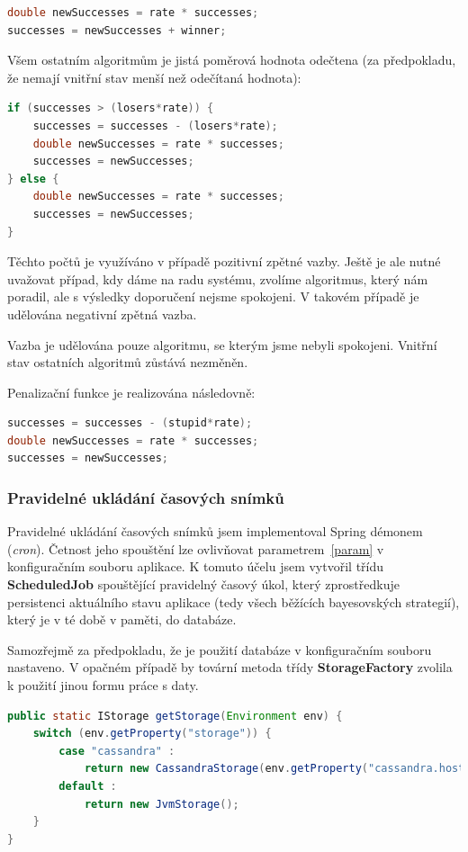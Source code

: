 \documentclass[thesis=M,czech]{FITthesis}[2014/05/07]
\begin{document}
\begin{lstlisting}[language=java]
double newSuccesses = rate * successes;
successes = newSuccesses + winner;
\end{lstlisting}	

Všem ostatním algoritmům je jistá poměrová hodnota odečtena (za předpokladu, že nemají vnitřní stav menší než odečítaná hodnota):

\begin{lstlisting}[language=java]
if (successes > (losers*rate)) {
    successes = successes - (losers*rate);
    double newSuccesses = rate * successes;
    successes = newSuccesses;
} else {
    double newSuccesses = rate * successes;
    successes = newSuccesses;            
}
\end{lstlisting}	

Těchto počtů je využíváno v případě pozitivní zpětné vazby. Ještě je ale nutné uvažovat případ, kdy dáme na radu systému, zvolíme algoritmus, který nám poradil, ale s výsledky doporučení nejsme spokojeni. V takovém případě je udělována negativní zpětná vazba.

Vazba je udělována pouze algoritmu, se kterým jsme nebyli spokojeni. Vnitřní stav ostatních algoritmů zůstává nezměněn.

Penalizační funkce je realizována následovně:

\begin{lstlisting}[language=java]
successes = successes - (stupid*rate);
double newSuccesses = rate * successes;
successes = newSuccesses;
\end{lstlisting}	
  
\subsubsection{Pravidelné ukládání časových snímků}
\label{task}
Pravidelné ukládání časových snímků jsem implementoval Spring démonem (\emph{cron}). Četnost jeho spouštění lze ovlivňovat parametrem~\ref{param} v konfiguračním souboru aplikace. K tomuto účelu jsem vytvořil třídu \textbf{ScheduledJob} spouštějící pravidelný časový úkol, který zprostředkuje persistenci aktuálního stavu aplikace (tedy všech běžících bayesovských strategií), který je v té době v paměti, do databáze.

Samozřejmě za předpokladu, že je použití databáze v konfiguračním souboru nastaveno. V opačném případě by tovární metoda třídy \textbf{StorageFactory} zvolila k použití jinou formu práce s daty.

\begin{lstlisting}[language=java]
public static IStorage getStorage(Environment env) {
    switch (env.getProperty("storage")) {
        case "cassandra" : 
            return new CassandraStorage(env.getProperty("cassandra.host"), env.getProperty("cassandra.keyspace"));                
        default : 
            return new JvmStorage();
    }
}
\end{lstlisting}
\end{document}
